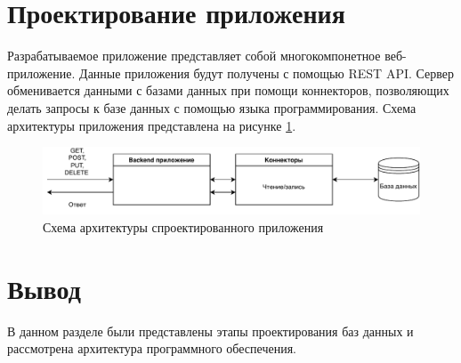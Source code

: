 \section{Проектирование приложения}
Разрабатываемое приложение представляет собой многокомпонетное веб-приложение. Данные приложения будут получены с помощью REST API. Сервер обменивается данными с базами данных при помощи коннекторов, позволяющих делать запросы к базе данных с помощью  языка программирования. Схема архитектуры приложения представлена на рисунке \ref*{img:arch}.

\begin{figure}[h!]
	\begin{center}
		\includegraphics[scale=0.8]{inc/img/architecture.pdf}
	\end{center}
	\captionsetup{justification=centering}
	\caption{Схема архитектуры спроектированного приложения}
	\label{img:arch}
\end{figure}

\section*{Вывод}

В данном разделе были представлены этапы проектирования баз данных и рассмотрена архитектура программного обеспечения.
